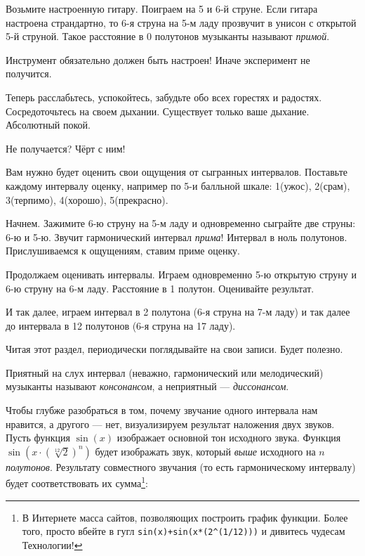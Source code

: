 \begin{Example}
    \label{ex:harmony:interval:string5and6}
    Возьмите настроенную гитару. Поиграем на 5 и 6-й струне. Если гитара настроена страндартно, то 6-я струна на 5-м ладу прозвучит в унисон с открытой 5-й струной. Такое расстояние в 0 полутонов музыканты называют \emph{примой}. 
    
    Инструмент обязательно должен быть настроен! Иначе эксперимент не получится.
    
    Теперь расслабьтесь, успокойтесь, забудьте обо всех горестях и радостях. Сосредоточьтесь на своем дыхании. Существует только ваше дыхание. Абсолютный покой. 
    
    Не получается? Чёрт с ним!

    Вам нужно будет оценить свои ощущения от сыгранных интервалов. Поставьте каждому интервалу оценку, например по 5-и балльной шкале: 1(ужос), 2(срам), 3(терпимо), 4(хорошо), 5(прекрасно).
    
    Начнем. Зажимите 6-ю струну на 5-м ладу и одновременно сыграйте две струны: 6-ю и 5-ю. Звучит гармонический интервал \emph{прима}! Интервал в ноль полутонов. Прислушиваемся к ощущениям, ставим приме оценку.
    
    Продолжаем оценивать интервалы. Играем одновременно 5-ю открытую струну и 6-ю струну на 6-м ладу. Расстояние в 1 полутон. Оценивайте результат.
    
    И так далее, играем интервал в 2 полутона (6-я струна на 7-м ладу) и так далее до интервала в 12 полутонов (6-я струна на 17 ладу). 
    
    Читая этот раздел, периодически поглядывайте на свои записи. Будет полезно.
\end{Example}

Приятный на слух интервал (неважно, гармонический или мелодический) музыканты называют \emph{консонансом}, а неприятный --- \emph{диссонансом}. 

Чтобы глубже разобраться в том, почему звучание одного интервала нам нравится, а другого --- нет, визуализируем результат наложения двух звуков. Пусть функция $\sin(x)$ изображает основной тон исходного звука. Функция $\sin(x\cdot(\sqrt[12]{2})^n)$ будет изображать звук, который \emph{выше} исходного на $n$ \emph{полутонов}. Результату совместного звучания (то есть гармоническому интервалу) будет соответствовать их сумма\footnote{В Интернете масса сайтов, позволяющих построить график функции. Более того, просто вбейте в гугл \texttt{sin(x)+sin(x*(2\^{}(1/12)))} и дивитесь чудесам Технологии!}:

